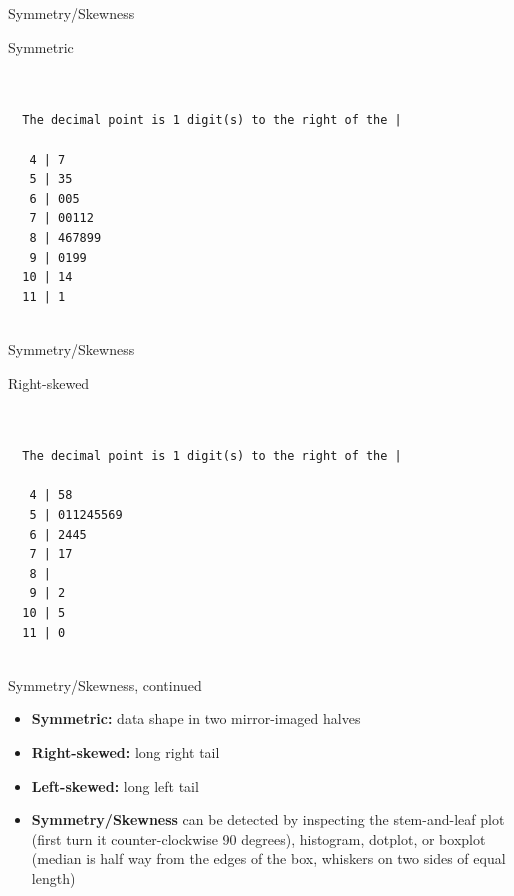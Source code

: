 \documentclass[14pt]{beamer}\usepackage[]{graphicx}\usepackage[]{color}
\begin{document}
\begin{frame}[fragile]{Symmetry/Skewness}

Symmetric

{\footnotesize{
\begin{verbatim}


  The decimal point is 1 digit(s) to the right of the |

   4 | 7
   5 | 35
   6 | 005
   7 | 00112
   8 | 467899
   9 | 0199
  10 | 14
  11 | 1


\end{verbatim}
}}
\end{frame}

\begin{frame}[fragile]{Symmetry/Skewness}

Right-skewed

{\footnotesize{
\begin{verbatim}


  The decimal point is 1 digit(s) to the right of the |

   4 | 58
   5 | 011245569
   6 | 2445
   7 | 17
   8 | 
   9 | 2
  10 | 5
  11 | 0


\end{verbatim}
}}
\end{frame}

\begin{frame}[fragile]{Symmetry/Skewness, continued}

\begin{itemize}
\item<1-> \textbf{Symmetric:} data shape in two mirror-imaged halves  
\item<2-> \textbf{Right-skewed:} long right tail
\item<3-> \textbf{Left-skewed:} long left tail
\item<4-> \textbf{Symmetry/Skewness} can be detected by inspecting the stem-and-leaf plot (first turn it  counter-clockwise 90 degrees), histogram, dotplot, or boxplot  (median is half way from the edges of the box, whiskers on two sides of equal length)
\end{itemize}
\end{frame}
\end{document}
